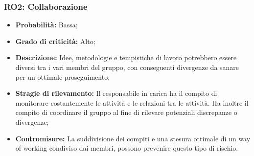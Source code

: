 \subsubsection{RO2: Collaborazione}
\begin{itemize}
    \item \textbf{Probabilità:} Bassa;
    \item \textbf{Grado di criticità:} Alto;
    \item \textbf{Descrizione:} Idee, metodologie e tempistiche di lavoro potrebbero essere diversi tra i vari membri del gruppo, con conseguenti divergenze da sanare per un ottimale proseguimento;
    \item \textbf{Stragie di rilevamento:} Il responsabile in carica ha il compito di monitorare costantemente le attività e le relazioni tra le attività. Ha inoltre il compito di coordinare il gruppo al fine di rilevare potenziali discrepanze o divergenze;
    \item \textbf{Contromisure:} La suddivisione dei compiti e una stesura ottimale di un way of working condiviso dai membri, possono prevenire questo tipo di rischio.
\end{itemize}
